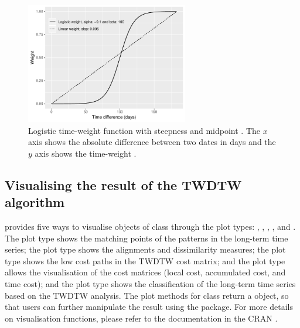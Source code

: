 \documentclass[article,shortnames]{jss}
\begin{document}
\begin{CodeChunk}
\begin{figure}[!h]

{\centering \includegraphics[width=2.7952755in]{dtwSat_files/figure-latex/logist-time-weight-1} 

}

\caption{Logistic time-weight function  with steepness  and midpoint . The $x$ axis shows the absolute difference between two dates in days and the $y$ axis shows the time-weight \citep{Maus:2016}.}\label{fig:logist-time-weight}
\end{figure}
\end{CodeChunk}

\hypertarget{visualising-the-result-of-the-twdtw-algorithm}{%
\subsection{Visualising the result of the TWDTW
algorithm}\label{visualising-the-result-of-the-twdtw-algorithm}}

 provides five ways to visualise objects of class
 through the plot types: ,
, , , and .
The plot type  shows the matching points of the patterns
in the long-term time series; the plot type  shows the
alignments and dissimilarity measures; the plot type  shows
the low cost paths in the TWDTW cost matrix; and the plot type
 allows the visualisation of the cost matrices (local cost,
accumulated cost, and time cost); and the plot type
 shows the classification of the long-term time
series based on the TWDTW analysis. The plot methods for class
 return a  object, so that users can
further manipulate the result using the  package. For more
details on visualisation functions, please refer to the 
documentation in the CRAN \citep{Maus:2015a}.
\end{document}
